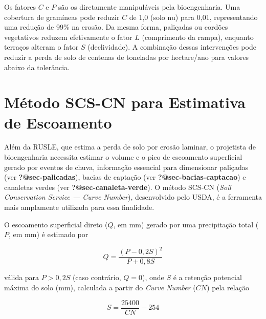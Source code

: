 \documentclass[
  portuguese,
  11pt,
  a4paper,
  open=any]{scrbook}
\begin{document}
\begin{tcolorbox}[enhanced jigsaw, leftrule=.75mm, colframe=quarto-callout-tip-color-frame, colback=white, bottomrule=.15mm, opacityback=0, colbacktitle=quarto-callout-tip-color!10!white, breakable, bottomtitle=1mm, opacitybacktitle=0.6, title=\textcolor{quarto-callout-tip-color}{\faLightbulb}\hspace{0.5em}{Parâmetro-chave para bioengenharia}, titlerule=0mm, toprule=.15mm, toptitle=1mm, rightrule=.15mm, left=2mm, arc=.35mm, coltitle=black]

Os fatores \(C\) e \(P\) são os diretamente manipuláveis pela
bioengenharia. Uma cobertura de gramíneas pode reduzir \(C\) de 1,0
(solo nu) para 0,01, representando uma redução de 99\% na erosão. Da
mesma forma, paliçadas ou cordões vegetativos reduzem efetivamente o
fator \(L\) (comprimento da rampa), enquanto terraços alteram o fator
\(S\) (declividade). A combinação dessas intervenções pode reduzir a
perda de solo de centenas de toneladas por hectare/ano para valores
abaixo da tolerância.

\end{tcolorbox}

\section{Método SCS-CN para Estimativa de
Escoamento}\label{muxe9todo-scs-cn-para-estimativa-de-escoamento}

Além da RUSLE, que estima a perda de solo por erosão laminar, o
projetista de bioengenharia necessita estimar o volume e o pico de
escoamento superficial gerado por eventos de chuva, informação essencial
para dimensionar paliçadas (ver \textbf{?@sec-palicadas}), bacias de
captação (ver \textbf{?@sec-bacias-captacao}) e canaletas verdes (ver
\textbf{?@sec-canaleta-verde}). O método SCS-CN (\emph{Soil Conservation
Service --- Curve Number}), desenvolvido pelo USDA, é a ferramenta mais
amplamente utilizada para essa finalidade.

O escoamento superficial direto (\(Q\), em mm) gerado por uma
precipitação total (\(P\), em mm) é estimado por

\[
Q = \frac{(P - 0{,}2S)^2}{P + 0{,}8S}
\]

válida para \(P > 0{,}2S\) (caso contrário, \(Q = 0\)), onde \(S\) é a
retenção potencial máxima do solo (mm), calculada a partir do
\emph{Curve Number} (\(CN\)) pela relação

\[
S = \frac{25400}{CN} - 254
\]
\end{document}
